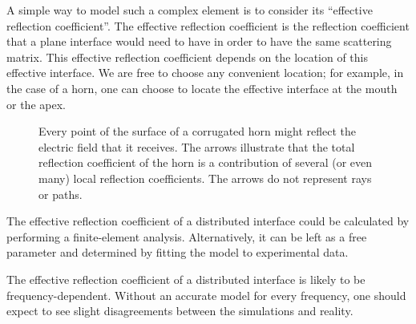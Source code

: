 A simple way to model such a complex element is to consider its ``effective reflection coefficient''.
The effective reflection coefficient is the reflection coefficient that a plane interface would need to have in order to have the same scattering matrix.
This effective reflection coefficient depends on the location of this effective interface.
We are free to choose any convenient location;
for example, in the case of a horn, one can choose to locate the effective interface at the mouth or the apex.

\begin{figure}
    \centering
    \caption{
        Every point of the surface of a corrugated horn might reflect the electric field
        that it receives.
        The arrows illustrate that the total reflection coefficient of the horn
        is a contribution of several (or even many) local reflection coefficients.
        The arrows do not represent rays or paths.
    }
    \label{fig:distributed_interface}
\end{figure}

The effective reflection coefficient of a distributed interface could be calculated by performing a finite-element analysis.
Alternatively, it can be left as a free parameter and determined by fitting the model to experimental data.

The effective reflection coefficient of a distributed interface is likely to be frequency-dependent.
Without an accurate model for every frequency, one should expect to see slight disagreements between the simulations and reality.




